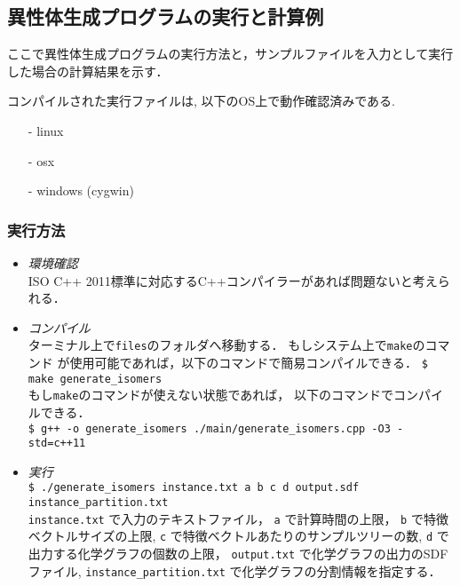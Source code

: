 \documentclass[11pt,titlepage,dvipdfmx,twoside]{jarticle}
\begin{document}
\bigskip




\subsection{異性体生成プログラムの実行と計算例}
\label{sec:Example_m}

ここで異性体生成プログラムの実行方法と，サンプルファイルを入力として実行した場合の計算結果を示す．


コンパイルされた実行ファイルは, 以下のOS上で動作確認済みである.
\begin{itemize}
\item[-] linux
\item[-] osx 
\item[-] windows (cygwin)
\end{itemize}


\subsubsection{実行方法}
\label{sec:compile_m}
\begin{itemize}
	\item {\em 環境確認}\\
		ISO C++ 2011標準に対応するC++コンパイラーがあれば問題ないと考えられる．
	\item {\em コンパイル}\\
	
	      ターミナル上で{\tt files}のフォルダへ移動する．
	      もしシステム上で{\tt make}のコマンド
	      が使用可能であれば，以下のコマンドで簡易コンパイルできる．
	      \verb|$ make generate_isomers|\\
	      もし{\tt make}のコマンドが使えない状態であれば，
	      以下のコマンドでコンパイルできる． \\  
		\verb|$ g++ -o generate_isomers ./main/generate_isomers.cpp -O3 -std=c++11| 
	\item {\em 実行}\\
		\verb|$ ./generate_isomers instance.txt a b c d output.sdf instance_partition.txt|\\
		\verb|instance.txt| で入力のテキストファイル，
		\verb|a| で計算時間の上限，
		\verb|b| で特徴ベクトルサイズの上限,
		\verb|c| で特徴ベクトルあたりのサンプルツリーの数,
		\verb|d| で出力する化学グラフの個数の上限，
		\verb|output.txt| で化学グラフの出力のSDFファイル,
		\verb|instance_partition.txt| で化学グラフの分割情報を指定する．
\end{itemize}
\end{document}
